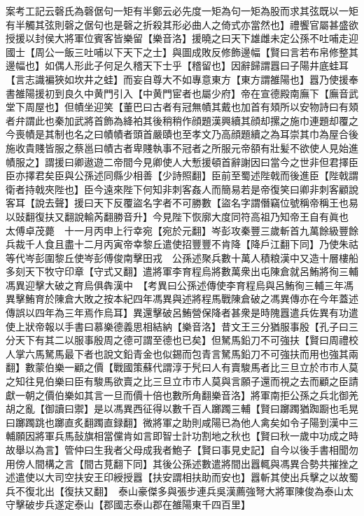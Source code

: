 案考工記云磬氏為磬倨句一矩有半鄭云必先度一矩為句一矩為股而求其弦既以一矩有半觸其弦則磬之倨句也是磬之折殺其形必曲人之倚式亦當然也】禮饗官屬甚盛欲授援以封侯大將軍位賓客皆樂留【樂音洛】援曉之曰天下雄雌未定公孫不吐哺走迎國士【周公一飯三吐哺以下天下之士】與圖成敗反修飾邊幅【賢曰言若布帛修整其邊幅也】如偶人形此子何足久稽天下士乎【稽留也】因辭歸謂囂曰子陽井底蛙耳【言志識褊狹如坎井之蛙】而妄自尊大不如專意東方【東方謂雒陽也】囂乃使援奉書雒陽援初到良久中黄門引入【中黄門宦者也屬少府】帝在宣德殿南廡下【廡音武堂下周屋也】但幘坐迎笑【董巴曰古者有冠無幘其戴也加首有頍所以安物詩曰有頍者弁謂此也秦加武將首飾為絳袙其後稍稍作顔題漢興續其顔却摞之施巾連題却覆之今喪幘是其制也名之曰幘幘者頭首嚴賾也至孝文乃高顔題續之為耳崇其巾為屋合後施收貴賤皆服之蔡邕曰幘古者卑賤執事不冠者之所服元帝頟有壯髪不欲使人見始進幘服之】謂援曰卿遨遊二帝間今見卿使人大慙援頓首辭謝因曰當今之世非但君擇臣臣亦擇君矣臣與公孫述同縣少相善【少詩照翻】臣前至蜀述陛戟而後進臣【陛戟謂衛者持戟夾陛也】臣今遠來陛下何知非刺客姦人而簡易若是帝復笑曰卿非刺客顧說客耳【說去聲】援曰天下反覆盜名字者不可勝數【盜名字謂僭竊位號稱帝稱王也易以䜴翻復扶又翻說輸芮翻勝音升】今見陛下恢廓大度同符高祖乃知帝王自有眞也　太傅卓茂薨　十一月丙申上行幸宛【宛於元翻】岑彭攻秦豐三歲斬首九萬餘級豐餘兵裁千人食且盡十二月丙寅帝幸黎丘遣使招豐豐不肯降【降戶江翻下同】乃使朱祜等代岑彭圍黎丘使岑彭傅俊南擊田戎　公孫述聚兵數十萬人積粮漢中又造十層樓船多刻天下牧守印章【守式又翻】遣將軍李育程烏將數萬衆出屯陳倉就呂鮪將徇三輔馮異迎擊大破之育烏俱犇漢中　【考異曰公孫述傳使李育程烏與呂鮪徇三輔三年馮異擊鮪育於陳倉大敗之按本紀四年馮異與述將程馬戰陳倉破之馮異傳亦在今年蓋述傳誤以四年為三年焉作烏耳】異還擊破呂鮪營保降者甚衆是時隗囂遣兵佐異有功遣使上狀帝報以手書曰慕樂德義思相結納【樂音洛】昔文王三分猶服事殷【孔子曰三分天下有其二以服事殷周之德可謂至德也已矣】但駑馬鉛刀不可強扶【賢曰周禮校人掌六馬駑馬最下者也說文鉛青金也似錫而包青言駑馬鉛刀不可強扶而用也強其兩翻】數蒙伯樂一顧之價【戰國策蘇代謂淳于髠曰人有賣駿馬者比三旦立於市市人莫之知往見伯樂曰臣有駿馬欲賣之比三旦立市市人莫與言願子還而視之去而顧之臣請獻一朝之價伯樂如其言一旦而價十倍也數所角翻樂音洛】將軍南拒公孫之兵北御羌胡之亂【御讀曰禦】是以馮異西征得以數千百人躑躅三輔【賢曰躑躅猶踟蹰也毛晃曰躑躅跳也躑直炙翻躅直録翻】微將軍之助則咸陽已為他人禽矣如令子陽到漢中三輔願因將軍兵馬鼔旗相當儻肯如言即智士計功割地之秋也【賢曰秋一歲中功成之時故舉以為言】管仲曰生我者父母成我者鮑子【賢曰事見史記】自今以後手書相聞勿用傍人間構之言【間古莧翻下同】其後公孫述數遣將間出囂輒與馮異合勢共摧挫之述遣使以大司空扶安王印綬授囂【扶安謂相扶助而安也】囂斬其使出兵擊之以故蜀兵不復北出【復扶又翻】　泰山豪傑多與張步連兵吳漢薦強弩大將軍陳俊為泰山太守擊破步兵遂定泰山【郡國志泰山郡在雒陽東千四百里】

